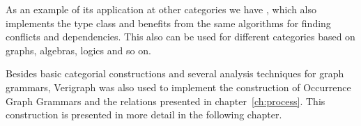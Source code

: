 As an example of its application at other categories we have , which also implements the  type class and benefits from the same algorithms for finding conflicts and dependencies. This also can be used for different categories based on graphs, algebras, logics and so on.

Besides basic categorial constructions and several analysis techniques for graph grammars, Verigraph was also used to implement the construction of Occurrence Graph Grammars and the relations presented in chapter~\ref{ch:process}. This construction is presented in more detail in the following chapter.


